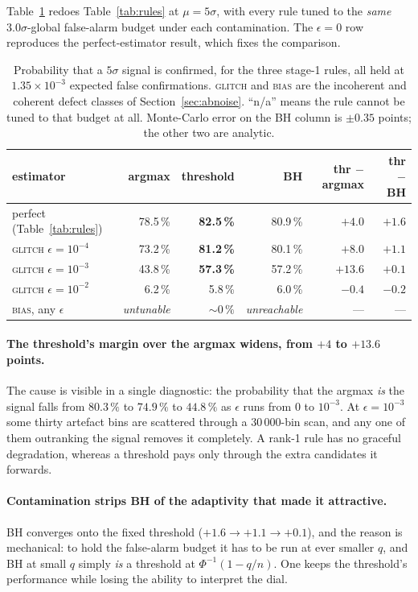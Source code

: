 Table~\ref{tab:selnoise} redoes Table~\ref{tab:rules} at $\mu = 5\sigma$, with every rule tuned to
the \emph{same} $3.0\sigma$-global false-alarm budget under each contamination. The
$\epsilon = 0$ row reproduces the perfect-estimator result, which fixes the comparison.

\begin{table}[htbp]
\centering
\caption{Probability that a $5\sigma$ signal is confirmed, for the three stage-1 rules, all held
at $1.35\times10^{-3}$ expected false confirmations. \textsc{glitch} and \textsc{bias} are the
incoherent and coherent defect classes of Section~\ref{sec:abnoise}. ``n/a'' means the rule cannot
be tuned to that budget at all. Monte-Carlo error on the BH column is $\pm0.35$ points; the other
two are analytic.}
\label{tab:selnoise}
\begin{tabular}{lrrrrr}
\toprule
estimator & argmax & threshold & BH & thr $-$ argmax & thr $-$ BH \\
\midrule
perfect (Table~\ref{tab:rules}) & 78.5\,\% & \textbf{82.5\,\%} & 80.9\,\% & $+4.0$ & $+1.6$ \\
\textsc{glitch} $\epsilon = 10^{-4}$ & 73.2\,\% & \textbf{81.2\,\%} & 80.1\,\% & $+8.0$ & $+1.1$ \\
\textsc{glitch} $\epsilon = 10^{-3}$ & 43.8\,\% & \textbf{57.3\,\%} & 57.2\,\% & $+13.6$ & $+0.1$ \\
\textsc{glitch} $\epsilon = 10^{-2}$ & 6.2\,\% & 5.8\,\% & 6.0\,\% & $-0.4$ & $-0.2$ \\
\textsc{bias}, any $\epsilon$ & \emph{untunable} & $\sim 0\,\%$ & \emph{unreachable} & --- & --- \\
\bottomrule
\end{tabular}
\end{table}

\paragraph{The threshold's margin over the argmax widens, from $+4$ to $+13.6$ points.} The cause
is visible in a single diagnostic: the probability that the argmax \emph{is} the signal falls from
$80.3\,\%$ to $74.9\,\%$ to $44.8\,\%$ as $\epsilon$ runs from $0$ to $10^{-3}$. At $\epsilon =
10^{-3}$ some thirty artefact bins are scattered through a $30\,000$-bin scan, and any one of them
outranking the signal removes it completely. A rank-1 rule has no graceful degradation, whereas a
threshold pays only through the extra candidates it forwards.

\paragraph{Contamination strips BH of the adaptivity that made it attractive.} BH converges onto
the fixed threshold ($+1.6 \to +1.1 \to +0.1$), and the reason is mechanical: to hold the
false-alarm budget it has to be run at ever smaller $q$, and BH at small $q$ simply \emph{is} a
threshold at $\Phi^{-1}(1-q/n)$. One keeps the threshold's performance while losing the ability to
interpret the dial.

